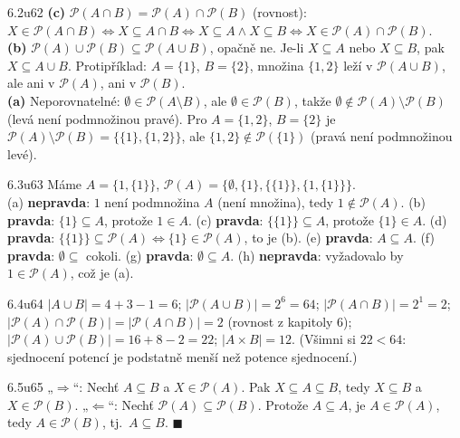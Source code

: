 \documentclass[10pt,a4paper]{article}
\newcommand{\sm}{\setminus}
\newcommand{\pravda}{\textcolor{good}{\sffamily\bfseries pravda}\xspace}
\newcommand{\nepravda}{\textcolor{warn}{\sffamily\bfseries nepravda}\xspace}
\newcommand{\qed}{\hfill$\blacksquare$}
\begin{document}
\begin{reseni}{6.2}{u62}
\textbf{(c)} $\mathcal P(A\cap B)=\mathcal P(A)\cap\mathcal P(B)$ (rovnost): $X\in\mathcal P(A\cap B)\iff X\subseteq A\cap B\iff X\subseteq A\land X\subseteq B\iff X\in\mathcal P(A)\cap\mathcal P(B)$.\\
\textbf{(b)} $\mathcal P(A)\cup\mathcal P(B)\subseteq\mathcal P(A\cup B)$, opačně ne. Je-li $X\subseteq A$ nebo $X\subseteq B$, pak $X\subseteq A\cup B$. Protipříklad: $A=\{1\}$, $B=\{2\}$, množina $\{1,2\}$ leží v $\mathcal P(A\cup B)$, ale ani v $\mathcal P(A)$, ani v $\mathcal P(B)$.\\
\textbf{(a)} Neporovnatelné: $\emptyset\in\mathcal P(A\sm B)$, ale $\emptyset\in\mathcal P(B)$, takže $\emptyset\notin\mathcal P(A)\sm\mathcal P(B)$ (levá není podmnožinou pravé). Pro $A=\{1,2\}$, $B=\{2\}$ je $\mathcal P(A)\sm\mathcal P(B)=\{\{1\},\{1,2\}\}$, ale $\{1,2\}\notin\mathcal P(\{1\})$ (pravá není podmnožinou levé).
\end{reseni}

\begin{reseni}{6.3}{u63}
Máme $A=\{1,\{1\}\}$, $\mathcal P(A)=\{\emptyset,\{1\},\{\{1\}\},\{1,\{1\}\}\}$.\\
(a) \nepravda: $1$ není podmnožina $A$ (není množina), tedy $1\notin\mathcal P(A)$. (b) \pravda: $\{1\}\subseteq A$, protože $1\in A$. (c) \pravda: $\{\{1\}\}\subseteq A$, protože $\{1\}\in A$. (d) \pravda: $\{\{1\}\}\subseteq\mathcal P(A)\iff\{1\}\in\mathcal P(A)$, to je (b). (e) \pravda: $A\subseteq A$. (f) \pravda: $\emptyset\subseteq$ cokoli. (g) \pravda: $\emptyset\subseteq A$. (h) \nepravda: vyžadovalo by $1\in\mathcal P(A)$, což je (a).
\end{reseni}

\begin{reseni}{6.4}{u64}
$|A\cup B|=4+3-1=6$; $|\mathcal P(A\cup B)|=2^6=64$; $|\mathcal P(A\cap B)|=2^1=2$; $|\mathcal P(A)\cap\mathcal P(B)|=|\mathcal P(A\cap B)|=2$ (rovnost z kapitoly 6); $|\mathcal P(A)\cup\mathcal P(B)|=16+8-2=22$; $|A\times B|=12$. (Všimni si $22<64$: sjednocení potencí je podstatně menší než potence sjednocení.)
\end{reseni}

\begin{reseni}{6.5}{u65}
„$\Rightarrow$“: Nechť $A\subseteq B$ a $X\in\mathcal P(A)$. Pak $X\subseteq A\subseteq B$, tedy $X\subseteq B$ a $X\in\mathcal P(B)$. „$\Leftarrow$“: Nechť $\mathcal P(A)\subseteq\mathcal P(B)$. Protože $A\subseteq A$, je $A\in\mathcal P(A)$, tedy $A\in\mathcal P(B)$, tj.\ $A\subseteq B$. \qed
\end{reseni}
\end{document}
